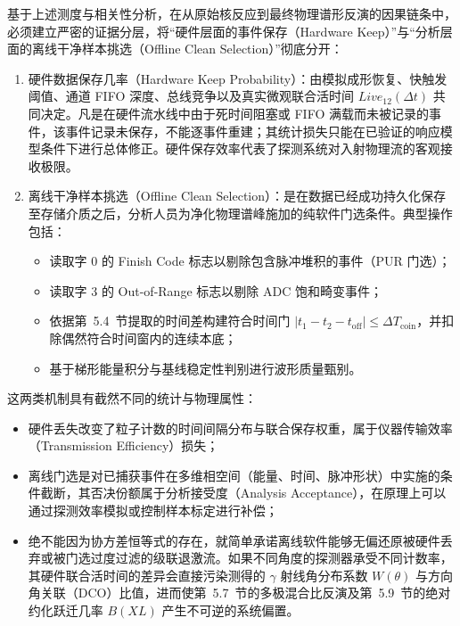 基于上述测度与相关性分析，在从原始核反应到最终物理谱形反演的因果链条中，必须建立严密的证据分层，将“硬件层面的事件保存（Hardware Keep）”与“分析层面的离线干净样本挑选（Offline Clean Selection）”彻底分开：
\begin{enumerate}
\item 硬件数据保存几率（Hardware Keep Probability）：由模拟成形恢复、快触发阈值、通道 FIFO 深度、总线竞争以及真实微观联合活时间 $Live_{12}(\Delta t)$ 共同决定。凡是在硬件流水线中由于死时间阻塞或 FIFO 满载而未被记录的事件，该事件记录未保存，不能逐事件重建；其统计损失只能在已验证的响应模型条件下进行总体修正。硬件保存效率代表了探测系统对入射物理流的客观接收极限。
\item 离线干净样本挑选（Offline Clean Selection）：是在数据已经成功持久化保存至存储介质之后，分析人员为净化物理谱峰施加的纯软件门选条件。典型操作包括：
\begin{itemize}
\item 读取字 0 的 Finish Code 标志以剔除包含脉冲堆积的事件（PUR 门选）；
\item 读取字 3 的 Out-of-Range 标志以剔除 ADC 饱和畸变事件；
\item 依据第~5.4~节提取的时间差构建符合时间门 $|t_1 - t_2 - t_{\mathrm{off}}| \le \Delta T_{\mathrm{coin}}$，并扣除偶然符合时间窗内的连续本底；
\item 基于梯形能量积分与基线稳定性判别进行波形质量甄别。
\end{itemize}
\end{enumerate}

这两类机制具有截然不同的统计与物理属性：
\begin{itemize}
\item 硬件丢失改变了粒子计数的时间间隔分布与联合保存权重，属于仪器传输效率（Transmission Efficiency）损失；
\item 离线门选是对已捕获事件在多维相空间（能量、时间、脉冲形状）中实施的条件截断，其否决份额属于分析接受度（Analysis Acceptance），在原理上可以通过探测效率模拟或控制样本标定进行补偿；
\item 绝不能因为协方差恒等式的存在，就简单承诺离线软件能够无偏还原被硬件丢弃或被门选过度过滤的级联退激流。如果不同角度的探测器承受不同计数率，其硬件联合活时间的差异会直接污染测得的 $\gamma$ 射线角分布系数 $W(\theta)$ 与方向角关联（DCO）比值，进而使第~5.7~节的多极混合比反演及第~5.9~节的绝对约化跃迁几率 $B(XL)$ 产生不可逆的系统偏置。
\end{itemize}
